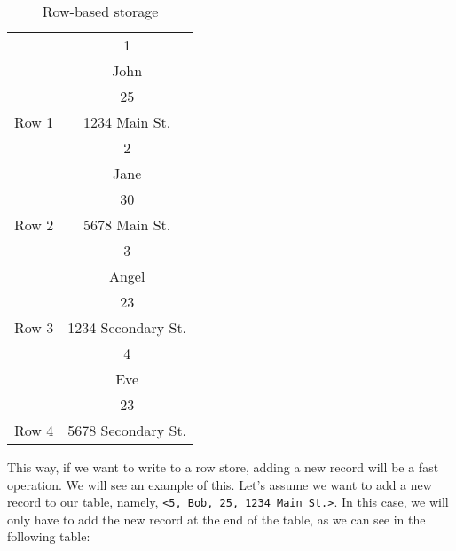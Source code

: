 \begin{table}[ht]
    \centering
    \begin{tabular}{|c|c|}
        \hline
        \cellcolor[HTML]{C0C0C0}                        & 1                  \\ \cline{2-2}
        \cellcolor[HTML]{C0C0C0}                        & John               \\ \cline{2-2}
        \cellcolor[HTML]{C0C0C0}                        & 25                 \\ \cline{2-2}
        \multirow{-4}{*}{\cellcolor[HTML]{C0C0C0}Row 1} & 1234 Main St.      \\ \hline
        \cellcolor[HTML]{C0C0C0}                        & 2                  \\ \cline{2-2}
        \cellcolor[HTML]{C0C0C0}                        & Jane               \\ \cline{2-2}
        \cellcolor[HTML]{C0C0C0}                        & 30                 \\ \cline{2-2}
        \multirow{-4}{*}{\cellcolor[HTML]{C0C0C0}Row 2} & 5678 Main St.      \\ \hline
        \cellcolor[HTML]{C0C0C0}                        & 3                  \\ \cline{2-2}
        \cellcolor[HTML]{C0C0C0}                        & Angel              \\ \cline{2-2}
        \cellcolor[HTML]{C0C0C0}                        & 23                 \\ \cline{2-2}
        \multirow{-4}{*}{\cellcolor[HTML]{C0C0C0}Row 3} & 1234 Secondary St. \\ \hline
        \cellcolor[HTML]{C0C0C0}                        & 4                  \\ \cline{2-2}
        \cellcolor[HTML]{C0C0C0}                        & Eve                \\ \cline{2-2}
        \cellcolor[HTML]{C0C0C0}                        & 23                 \\ \cline{2-2}
        \multirow{-4}{*}{\cellcolor[HTML]{C0C0C0}Row 4} & 5678 Secondary St. \\ \hline
    \end{tabular}
    \caption{Row-based storage}
\end{table}

This way, if we want to write to a row store, adding a new record will be a fast operation. We will see an example of this. Let's assume we want to add a new record to our table, namely, \texttt{<5, Bob, 25, 1234 Main St.>}. In this case, we will only have to add the new record at the end of the table, as we can see in the following table:

